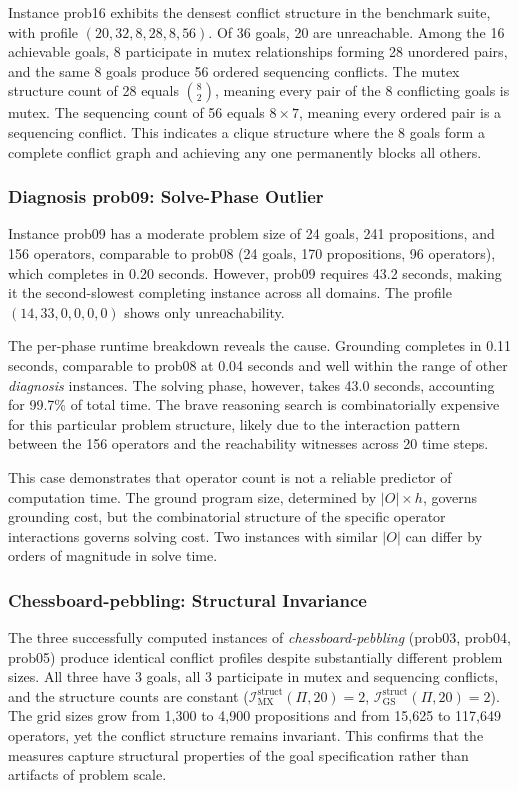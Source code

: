 Instance prob16 exhibits the densest conflict structure in the benchmark suite, with profile $(20, 32, 8, 28, 8, 56)$. Of 36 goals, 20 are unreachable. Among the 16 achievable goals, 8 participate in mutex relationships forming 28 unordered pairs, and the same 8 goals produce 56 ordered sequencing conflicts. The mutex structure count of 28 equals $\binom{8}{2}$, meaning every pair of the 8 conflicting goals is mutex. The sequencing count of 56 equals $8 \times 7$, meaning every ordered pair is a sequencing conflict. This indicates a clique structure where the 8 goals form a complete conflict graph and achieving any one permanently blocks all others.

\subsubsection{Diagnosis prob09: Solve-Phase Outlier}

Instance prob09 has a moderate problem size of 24 goals, 241 propositions, and 156 operators, comparable to prob08 (24 goals, 170 propositions, 96 operators), which completes in 0.20 seconds. However, prob09 requires 43.2 seconds, making it the second-slowest completing instance across all domains. The profile $(14, 33, 0, 0, 0, 0)$ shows only unreachability.

The per-phase runtime breakdown reveals the cause. Grounding completes in 0.11 seconds, comparable to prob08 at 0.04 seconds and well within the range of other \textit{diagnosis} instances. The solving phase, however, takes 43.0 seconds, accounting for 99.7\% of total time. The brave reasoning search is combinatorially expensive for this particular problem structure, likely due to the interaction pattern between the 156 operators and the reachability witnesses across 20 time steps.

This case demonstrates that operator count is not a reliable predictor of computation time. The ground program size, determined by $|O| \times h$, governs grounding cost, but the combinatorial structure of the specific operator interactions governs solving cost. Two instances with similar $|O|$ can differ by orders of magnitude in solve time.

\subsubsection{Chessboard-pebbling: Structural Invariance}

The three successfully computed instances of \textit{chessboard-pebbling} (prob03, prob04, prob05) produce identical conflict profiles despite substantially different problem sizes. All three have 3 goals, all 3 participate in mutex and sequencing conflicts, and the structure counts are constant ($\mathcal{I}^{\text{struct}}_{\text{MX}}(\Pi, 20) = 2$, $\mathcal{I}^{\text{struct}}_{\text{GS}}(\Pi, 20) = 2$). The grid sizes grow from 1{,}300 to 4{,}900 propositions and from 15{,}625 to 117{,}649 operators, yet the conflict structure remains invariant. This confirms that the measures capture structural properties of the goal specification rather than artifacts of problem scale.

